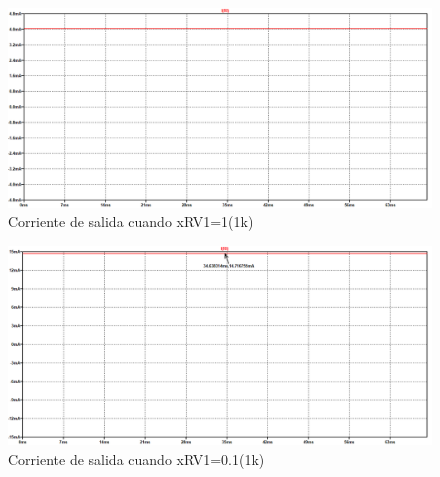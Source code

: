 \begin{enumerate}
\begin{enumerate}
\begin{itemize}
                            \begin{figure}[H]
                                \centering
                                \renewcommand{\figurename}{Gráfica}
                                \includegraphics[width=15cm]{Imagenes/sim_fuente_corriente_variable_corrx1.png}
                                \caption{Corriente de salida cuando  xRV1=1(1k)}
                                \label{fig:sim_fuente_corriente_variable_corrx1}
                            \end{figure}

                            \begin{figure}[H]
                                \centering
                                \renewcommand{\figurename}{Gráfica}
                                \includegraphics[width=15cm]{Imagenes/sim_fuente_corriente_variable_corrx01.png}
                                \caption{Corriente de salida cuando  xRV1=0.1(1k)}
                                \label{fig:sim_fuente_corriente_variable_corrx01}
                            \end{figure}


\end{itemize}
\end{enumerate}
\end{enumerate}
